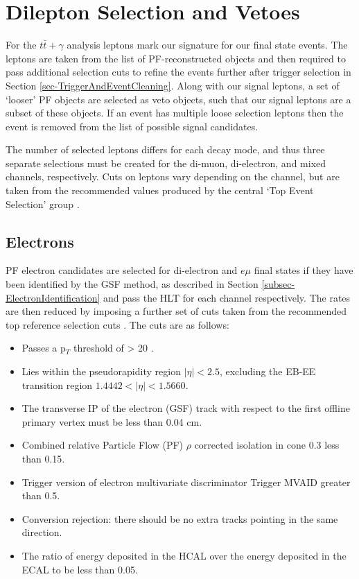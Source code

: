 
\section{Dilepton Selection and Vetoes}

For the $t\bar{t}+\gamma$ analysis leptons mark our signature for our final state events. The leptons are taken from the list of PF-reconstructed objects and then required to pass additional selection cuts to refine the events further after trigger selection in Section \ref{sec-TriggerAndEventCleaning}. Along with our signal leptons, a set of `looser' PF objects are selected as veto objects, such that our signal leptons are a subset of these objects. If an event has multiple loose selection leptons then the event is removed from the list of possible signal candidates.

The number of selected leptons differs for each decay mode, and thus three separate selections must be created for the di-muon, di-electron, and mixed channels, respectively. Cuts on leptons vary depending on the channel, but are taken from the recommended values produced by the central `Top Event Selection' group \cite{TopEventSelection}. 

\subsection{Electrons}

PF electron candidates are selected for di-electron and $e\mu$ final states if they have been identified by the GSF method, as described in Section \ref{subsec-ElectronIdentification} and pass the HLT for each channel respectively. The rates are then reduced by imposing a further set of cuts taken from the recommended top reference selection cuts \cite{TOPEGM1}. The cuts are as follows:

\begin{itemize}
	\item Passes a p$_T$ threshold of > 20 \GeV.
	\item Lies within the pseudorapidity region $|\eta| < 2.5$, excluding the EB-EE transition region $1.4442 < |\eta| < 1.5660$.
	\item The transverse IP of the electron (GSF) track with respect to the first offline primary vertex must be less than 0.04 cm. 
	\item Combined relative Particle Flow (PF) $\rho$ corrected isolation in cone 0.3 less than 0.15.
	\item Trigger version of electron multivariate discriminator Trigger MVAID greater than 0.5.
	\item Conversion rejection: there should be no extra tracks pointing in the same direction.
	\item The ratio of energy deposited in the HCAL over the energy deposited in the ECAL to be less than 0.05.
\end{itemize} 

